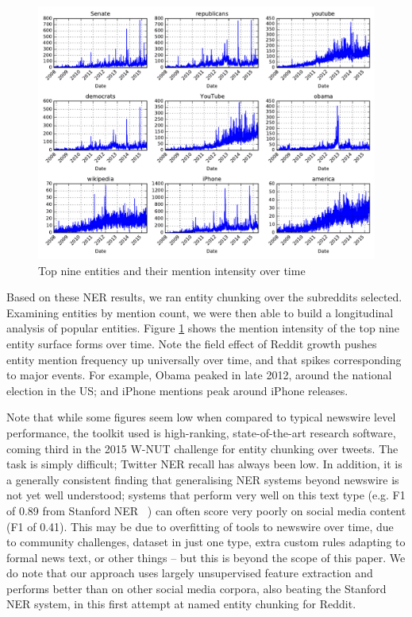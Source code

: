 \documentclass[10pt,journal,compsoc]{IEEEtran}
\begin{document}
\begin{figure}
\begin{center}
\includegraphics[width=0.79\columnwidth]{plots/entity_ts.pdf}
\caption{Top nine entities and their mention intensity over time}
\label{fig:entity-ts}
\end{center}
\end{figure}

Based on these NER results, we ran entity chunking over the subreddits selected.
Examining entities by mention count, we were then able to build a longitudinal analysis of popular entities.
Figure \ref{fig:entity-ts} shows the mention intensity of the top nine entity surface forms over time.
Note the field effect of Reddit growth pushes entity mention frequency up universally over time, and that spikes corresponding to major events.
For example, Obama peaked in late 2012, around the national election in the US; and iPhone mentions peak around iPhone releases.

Note that while some figures seem low when compared to typical newswire level performance, the toolkit used is high-ranking, state-of-the-art research software, coming third in the 2015 W-NUT challenge for entity chunking over tweets.
The task is simply difficult; Twitter NER recall has always been low.
In addition, it is a generally consistent finding that generalising NER systems beyond newswire is not yet well understood; systems that perform very well on this text type (e.g. F1 of 0.89 from Stanford NER~\cite{derczynski2015analysis}%
) can often score very poorly on social media content (F1 of 0.41).
This may be due to overfitting of tools to newswire over time, due to community challenges, dataset in just one type, extra custom rules adapting to formal news text, or other things -- but this is beyond the scope of this paper.
We do note that our approach uses largely unsupervised feature extraction and performs better than on other social media corpora, also beating the Stanford NER system, in this first attempt at named entity chunking for Reddit.
\end{document}
